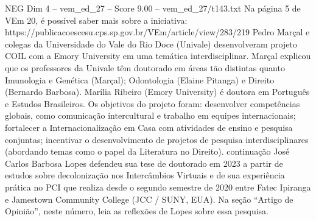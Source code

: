 \begin{textsample}{NEG Dim 4 – vem\_ed\_27 – Score 9.00 – vem\_ed\_27/t143.txt}
Na página 5 de VEm 20, é possível saber mais sobre a iniciativa: https://publicacoescesu.cps.sp.gov.br/VEm/article/view/283/219 Pedro Marçal e colegas da Universidade do Vale do Rio Doce (Univale) desenvolveram projeto COIL com a Emory University em uma temática interdisciplinar.
Marçal explicou que os professores da Univale têm doutorado em áreas tão distintas quanto Imunologia e Genética (Marçal); Odontologia (Elaine Pitanga) e Direito (Bernardo Barbosa).
Marília Ribeiro (Emory University) é doutora em Português e Estudos Brasileiros.
Os objetivos do projeto foram: desenvolver competências globais, como comunicação intercultural e trabalho em equipes internacionais; fortalecer a Internacionalização em Casa com atividades de ensino e pesquisa conjuntas; incentivar o desenvolvimento de projetos de pesquisa interdisciplinares (abordando temas como o papel da Literatura no Direito). continuação José Carlos Barbosa Lopes defendeu sua tese de doutorado em 2023 a partir de estudos sobre decolonização nos Intercâmbios Virtuais e de sua experiência prática no PCI que realiza desde o segundo semestre de 2020 entre Fatec Ipiranga e Jamestown Community College (JCC / SUNY, EUA).
Na seção “Artigo de Opinião”, neste número, leia as reflexões de Lopes sobre essa pesquisa.

\end{textsample}
